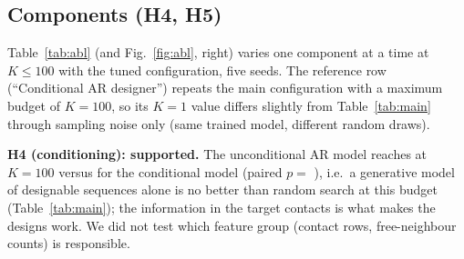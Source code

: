 \subsection*{Components (H4, H5)}
Table~\ref{tab:abl} (and Fig.~\ref{fig:abl}, right) varies one component at a time at $K\le 100$ with the tuned configuration, five seeds. The reference row (``Conditional AR designer'') repeats the main configuration with a maximum budget of $K=100$, so its $K=1$ value differs slightly from Table~\ref{tab:main} through sampling noise only (same trained model, different random draws).

\begin{table}[t]\centering\caption{Ablations of the AR designer (five seeds). test\_nll: held-out NLL of the true designing sequences (nats/residue).}\label{tab:abl}

\end{table}

\textbf{H4 (conditioning): supported.} The unconditional AR model reaches  at $K=100$ versus  for the conditional model (paired $p=$ ), i.e.\ a generative model of designable sequences alone is no better than random search at this budget (Table~\ref{tab:main}); the information in the target contacts is what makes the designs work. We did not test which feature group (contact rows, free-neighbour counts) is responsible.

